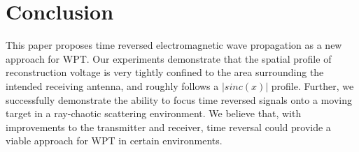 \section{Conclusion}
\label{sec:conclusion}

This paper proposes time reversed electromagnetic wave propagation as a new
approach for WPT.
%
Our experiments demonstrate that the spatial profile of reconstruction voltage
is very tightly confined to the area surrounding the intended receiving antenna,
and roughly follows a $\left|sinc(x)\right|$ profile.
%
Further, we successfully demonstrate the ability to focus time reversed signals
onto a moving target in a ray-chaotic scattering environment.
%
We believe that, with improvements to the transmitter and receiver, time reversal
could provide a viable approach for WPT in certain environments.
